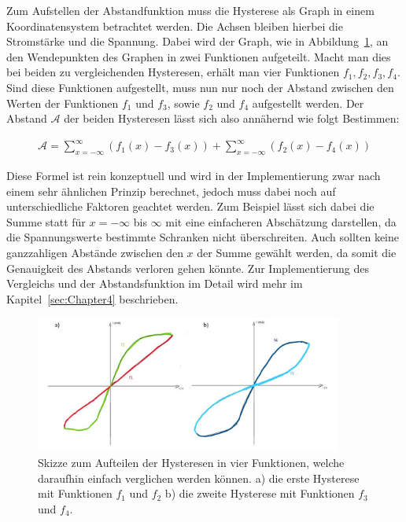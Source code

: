 Zum Aufstellen der Abstandfunktion muss die Hysterese als Graph in einem Koordinatensystem betrachtet werden. Die Achsen bleiben hierbei die Stromstärke und die Spannung. Dabei wird der Graph, wie in Abbildung~\ref{fig:Hysteresenfunktionen}, an den Wendepunkten des Graphen in zwei Funktionen aufgeteilt. Macht man dies bei beiden zu vergleichenden Hysteresen, erhält man vier Funktionen $f_1, f_2, f_3, f_4$. Sind diese Funktionen aufgestellt, muss nun nur noch der Abstand zwischen den Werten der Funktionen $f_1$ und $f_3$, sowie $f_2$ und $f_4$ aufgestellt werden. Der Abstand $\mathcal{A}$ der beiden Hysteresen lässt sich also annähernd wie folgt Bestimmen:

\begin{align}
  \mathcal{A} = \sum_{x = - \infty}^\infty (f_1(x) - f_3(x)) + \sum_{x = - \infty}^\infty (f_2(x) - f_4(x))
\end{align}

Diese Formel ist rein konzeptuell und wird in der Implementierung zwar nach einem sehr ähnlichen Prinzip berechnet, jedoch muss dabei noch auf unterschiedliche Faktoren geachtet werden. Zum Beispiel lässt sich dabei die Summe statt für $x=-\infty$ bis $\infty$ mit eine einfacheren Abschätzung darstellen, da die Spannungswerte bestimmte Schranken nicht überschreiten. Auch sollten keine ganzzahligen Abstände zwischen den $x$ der Summe gewählt werden, da somit die Genauigkeit des Abstands verloren gehen könnte. Zur Implementierung des Vergleichs und der Abstandsfunktion im Detail wird mehr im Kapitel~\ref{sec:Chapter4} beschrieben.

\begin{figure}
  \centering
  \includegraphics[width=0.9\textwidth]{images/Hysteresenfunktionen}
  \caption{Skizze zum Aufteilen der Hysteresen in vier Funktionen, welche daraufhin einfach verglichen werden können. a) die erste Hysterese mit Funktionen $f_1$ und $f_2$ b) die zweite Hysterese mit Funktionen $f_3$ und $f_4$.}
  \label{fig:Hysteresenfunktionen}
\end{figure}

